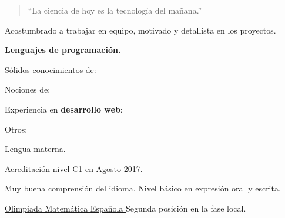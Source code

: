 

\begin{quote}
  ``La ciencia de hoy es la tecnología del mañana.''
\end{quote}


Acostumbrado a trabajar en equipo, motivado y detallista en los proyectos.

\divider

\textbf{Lenguajes de programación.} \\ \medskip

Sólidos conocimientos de:

\begin{center}
\end{center}

Nociones de: \quad
{}

\divider

Experiencia en \textbf{desarrollo web}:
\vspace{-.05cm}
\begin{center}
\end{center}
\vspace{-.25cm}

\divider

Otros: \quad
{}
\cvtag{\LaTeX}

\medskip



\smallskip
Lengua materna.
\vspace{-.35cm}
\divider

\smallskip
Acreditación nivel C1 en Agosto 2017.
\vspace{-.35cm}
\divider

\smallskip
Muy buena comprensión del idioma. Nivel básico en expresión oral y escrita.

\medskip


\cvachievement{\faTrophy}
{\href{http://www.olimpiadamatematica.es/platea.pntic.mec.es/_csanchez/olimmain.html}
  {Olimpiada Matemática Española \smallskip}}
{\small{}%
  \small{}}
Segunda posición en la fase local.

